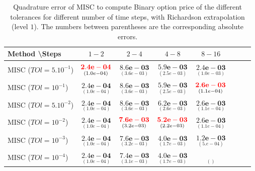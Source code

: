 \documentclass[11pt]{article}
\begin{document}
\begin{table}[h!]
	\centering
	\begin{tabular}{l*{6}{c}r}
		Method \textbackslash  Steps            & $1-2$ & $2-4$ & $4-8$ & $8-16$  \\
		\hline
		MISC ($TOl=5.10^{-1}$)  & $\underset{(   1.0e-04)}{\mathbf{ {\color{red}2.4e-04}}}$ & $\underset{(3.6e-03)}{\mathbf{8.6e-03}}$  & $\underset{(2.5e-03)}{\mathbf{5.9e-03}}$ &$\underset{(1.0e-03)}{\mathbf{2.4e-03}}$ \\
		MISC ($TOl=10^{-1}$)   & $\underset{(   1.0e-04)}{\mathbf{ 2.4e-04}}$ & $\underset{(3.6e-03)}{\mathbf{8.6e-03}}$  & $\underset{(2.5e-03)}{\mathbf{5.9e-03}}$ &$\underset{(   1.1e-04)}{\mathbf{ {\color{red}2.6e-03}}}$ \\
		MISC ($TOl=5.10^{-2}$)  & $\underset{(   1.0e-04)}{\mathbf{ 2.4e-04}}$ & $\underset{(3.6e-03)}{\mathbf{8.6e-03}}$ & $\underset{(2.6e-03)}{\mathbf{6.2e-03}}$ &$\underset{(   1.1e-04)}{\mathbf{ 2.6e-03}}$ \\
		MISC ($TOl=10^{-2}$)  & $\underset{(   1.0e-04)}{\mathbf{ 2.4e-04}}$ & $\underset{(3.2e-03)}{\mathbf{{\color{red}7.6e-03}}}$  & $\underset{(2.2e-03)}{\mathbf{{\color{red}5.2e-03}}}$ &$\underset{(   1.1e-04)}{\mathbf{ 2.6e-03}}$\\
		MISC ($TOl=10^{-3}$)  & $\underset{(   1.0e-04)}{\mathbf{ 2.4e-04}}$ & $\underset{(3.2e-03)}{\mathbf{7.6e-03}}$  & $\underset{(1.7e-03)}{\mathbf{4.0e-03}}$ &$\underset{(   5.e-04)}{\mathbf{1.2e-03}}$ \\
	MISC ($TOl=10^{-4}$)  & $\underset{(   1.0e-04)}{\mathbf{ 2.4e-04}}$ & $\underset{(3.1e-03)}{\mathbf{7.4e-03}}$  & $\underset{(1.7e-03)}{\mathbf{4.0e-03}}$ &$\underset{()}{\mathbf{}}$ \\
		\hline
	\end{tabular}
	\caption{Quadrature error of MISC to compute Binary option price of the different tolerances for different number of time steps, with Richardson extrapolation (level $1$). The numbers between parentheses are the corresponding absolute errors.}
	\label{Quadrature error of MISC to compute Binary option price of the different tolerances for different number of time steps, with Richardson extrapolation (level $1$). The numbers between parentheses are the corresponding absolute errors.}
\end{table}
\end{document}
